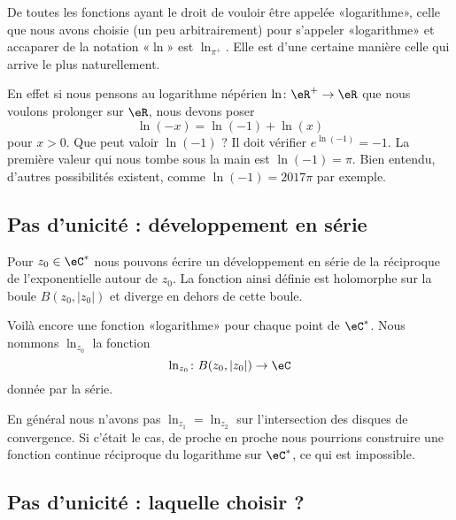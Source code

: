 De toutes les fonctions ayant le droit de vouloir être appelée «logarithme», celle que nous avons choisie (un peu arbitrairement) pour s'appeler «logarithme» et accaparer de la notation «\( \ln\)» est \( \ln_{\pi^+}\). Elle est d'une certaine manière celle qui arrive le plus naturellement.

En effet si nous pensons au logarithme népérien \( \ln\colon \eR^+\to \eR\) que nous voulons prolonger sur \( \eR\), nous devons poser
\begin{equation}
	\ln(-x)=\ln(-1)+\ln(x)
\end{equation}
pour \( x>0\). Que peut valoir \( \ln(-1)\) ? Il doit vérifier \(  e^{\ln(-1)}=-1\). La première valeur qui nous tombe sous la main est \( \ln(-1)=\pi\). Bien entendu, d'autres possibilités existent, comme \( \ln(-1)=2017\pi\) par exemple.

\subsection{Pas d'unicité : développement en série}

Pour \( z_0\in \eC^*\) nous pouvons écrire un développement en série de la réciproque de l'exponentielle autour de \( z_0\). La fonction ainsi définie est holomorphe sur la boule \( B(z_0,| z_0 |)\) et diverge en dehors de cette boule.

Voilà encore une fonction «logarithme» pour chaque point de \( \eC^*\). Nous nommons \( \ln_{z_0}\) la fonction
\begin{equation}
	\ln_{z_0}\colon B(z_0,| z_0 |)\to \eC
\end{equation}
donnée par la série.

En général nous n'avons pas \( \ln_{z_1}=\ln_{z_2}\) sur l'intersection des disques de convergence. Si c'était le cas, de proche en proche nous pourrions construire une fonction continue réciproque du logarithme sur \( \eC^*\), ce qui est impossible.

\subsection{Pas d'unicité : laquelle choisir ?}

